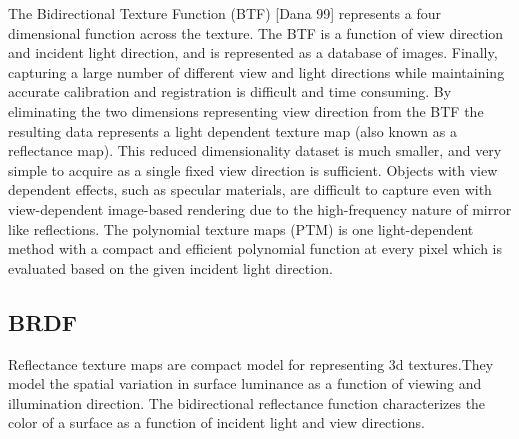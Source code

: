 The Bidirectional Texture Function (BTF) [Dana 99] represents a four dimensional function across the texture.
The BTF is a function of view direction and incident light direction, and is represented as a database of images.
Finally, capturing a large number of different view
and light directions while maintaining accurate calibration and registration is difficult and time consuming.
By eliminating the two dimensions representing view direction from the BTF the resulting data represents a light
dependent texture map (also known as a reflectance map). This reduced dimensionality dataset is much smaller,
and very simple to acquire as a single fixed view direction is sufficient. Objects with view dependent effects, such as specular materials, are
difficult to capture even with view-dependent image-based rendering due to the high-frequency nature of mirror
like reflections.  The 
polynomial texture maps (PTM) is one light-dependent method with a compact and efficient polynomial function 
at every pixel which is evaluated based on the given incident light direction.






\subsection{BRDF}

Reflectance texture maps are compact model for representing 3d textures.They model the spatial
variation in surface luminance as a function of viewing and illumination direction.
The bidirectional reflectance function \cite{C3} characterizes the color of a surface as a function
of incident light and view directions.

